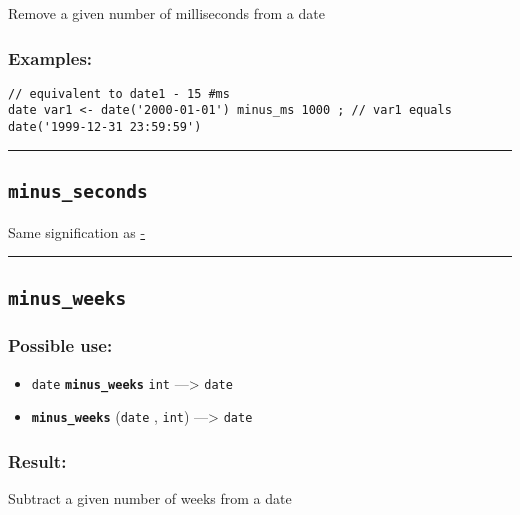 \documentclass[]{book}
\providecommand{\tightlist}{%
  \setlength{\itemsep}{0pt}\setlength{\parskip}{0pt}}
\theoremstyle{definition}
\theoremstyle{definition}
\theoremstyle{definition}
\theoremstyle{remark}
\begin{document}
Remove a given number of milliseconds from a date

\subsubsection{Examples:}\label{examples-247}

\begin{verbatim}
// equivalent to date1 - 15 #ms  
date var1 <- date('2000-01-01') minus_ms 1000 ; // var1 equals date('1999-12-31 23:59:59')
\end{verbatim}

\begin{center}\rule{0.5\linewidth}{\linethickness}\end{center}

\subsection{\texorpdfstring{\texttt{minus\_seconds}}{minus\_seconds}}\label{minus_seconds}

Same signification as \href{OperatorsAA\#-}{-}

\begin{center}\rule{0.5\linewidth}{\linethickness}\end{center}

\subsection{\texorpdfstring{\texttt{minus\_weeks}}{minus\_weeks}}\label{minus_weeks}

\subsubsection{Possible use:}\label{possible-use-358}

\begin{itemize}
\tightlist
\item
  \texttt{date} \textbf{\texttt{minus\_weeks}} \texttt{int}
  ---\textgreater{} \texttt{date}
\item
  \textbf{\texttt{minus\_weeks}} (\texttt{date} , \texttt{int})
  ---\textgreater{} \texttt{date}
\end{itemize}

\subsubsection{Result:}\label{result-347}

Subtract a given number of weeks from a date
\end{document}
